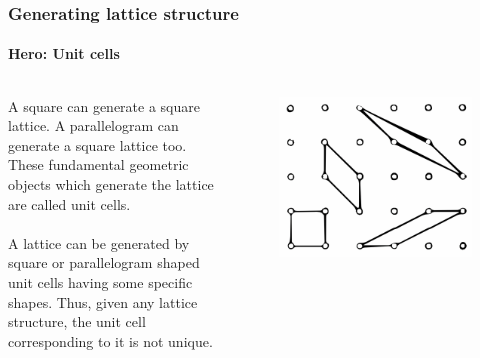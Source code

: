 \documentclass{beamer}
\begin{document}
    \begin{frame}
        \frametitle{Generating lattice structure}
        \framesubtitle{Hero: Unit cells}
        \begin{columns}
                A square can generate a square lattice. A parallelogram can generate a square lattice too. These fundamental geometric objects which generate the lattice are called unit cells. \\~\\

                A lattice can be generated by square or parallelogram shaped unit cells having some specific shapes. Thus, given any lattice structure, the unit cell corresponding to it is not unique.
                \begin{figure}
                    \centering
                    \includegraphics[scale=0.20]{unit.png}
                \end{figure}
        \end{columns}
    \end{frame}
\end{document}
